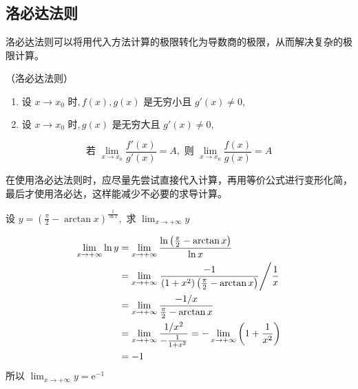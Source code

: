\subsection{洛必达法则}
洛必达法则可以将用代入方法计算的极限转化为导数商的极限，从而解决复杂的极限计算。
\begin{theorem}
    \label{th:洛必达法则}
    （洛必达法则）
    ~
    \begin{enumerate}
        \item $\text{设~}x\to x_0\text{ 时}, f(x),g(x)\text{ 是无穷小且~}g'(x)\neq 0,$
        \item $\text{设~}x\to x_0\text{ 时}, g(x)\text{ 是无穷大且~}g'(x)\neq 0,$
    \end{enumerate}
    \[ \text{若~}\lim_{x\to x_0}\frac{f'(x)}{g'(x)}=A, \text{ 则~} \lim_{x\to x_0}\frac{f(x)}{g(x)}=A \]
\end{theorem}
\begin{situation}
    在使用洛必达法则时，应尽量先尝试直接代入计算，再用等价公式进行变形化简，最后才使用洛必达，这样能减少不必要的求导计算。
\end{situation}
\begin{example}
    $\text{设~}y=\left(\frac{\pi}{2}-\arctan x\right)^{\frac{1}{\ln x}}, \text{ 求~}\lim_{x\to +\infty}y$
\end{example}
\begin{solution}
    \begin{align*}
        \lim_{x\to +\infty}\ln y
         & = \lim_{x\to +\infty}\frac{\ln\left(\frac{\pi}{2}-\arctan x\right)}{\ln x}                                     \\
         & = \lim_{x\to +\infty}\left. \frac{-1}{(1+x^2)\left(\frac{\pi}{2}-\arctan x\right)} \middle/ \frac{1}{x}\right. \\
         & = \lim_{x\to +\infty} \frac{-1/x}{\frac{\pi}{2}-\arctan x}                                                     \\
         & = \lim_{x\to +\infty} \frac{1/x^2}{-\frac{1}{1+x^2}} = -\lim_{x\to +\infty} \left(1+\frac{1}{x^2}\right)       \\
         & =-1
    \end{align*}
    所以 $\lim_{x\to +\infty}y=\mathrm{e}^{-1}$
\end{solution}

